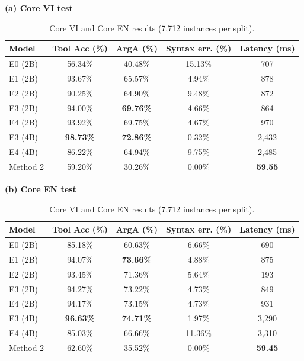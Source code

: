 \documentclass[10pt,twocolumn,a4paper]{article}
\newcommand{\tabletext}{\small}
\begin{document}
\begin{table}[htbp]
    \centering
    \caption{Core VI and Core EN results (7,712 instances per split).}
    \label{tab:core-results}
    \tabletext
    \textbf{(a) Core VI test}\\[2pt]
    \begin{tabular*}{\textwidth}{@{\extracolsep{\fill}}lcccc@{}}
        \toprule
        \textbf{Model} & \textbf{Tool Acc (\%)} & \textbf{ArgA (\%)} & \textbf{Syntax err. (\%)} & \textbf{Latency (ms)} \\
        \midrule
        E0 (2B) & 56.34\% & 40.48\% & 15.13\% & 707 \\
        E1 (2B) & 93.67\% & 65.57\% & 4.94\% & 878 \\
        E2 (2B) & 90.25\% & 64.90\% & 9.48\% & 872 \\
        E3 (2B) & 94.00\% & \textbf{69.76\%} & 4.66\% & 864 \\
        E4 (2B) & 93.92\% & 69.75\% & 4.67\% & 970 \\
        E3 (4B) & \textbf{98.73\%} & \textbf{72.86\%} & 0.32\% & 2,432 \\
        E4 (4B) & 86.22\% & 64.94\% & 9.75\% & 2,485 \\
        Method 2 & 59.20\% & 30.26\% & 0.00\% & \textbf{59.55} \\
        \bottomrule
    \end{tabular*}
    \par\medskip
    \textbf{(b) Core EN test}\\[2pt]
    \begin{tabular*}{\textwidth}{@{\extracolsep{\fill}}lcccc@{}}
        \toprule
        \textbf{Model} & \textbf{Tool Acc (\%)} & \textbf{ArgA (\%)} & \textbf{Syntax err. (\%)} & \textbf{Latency (ms)} \\
        \midrule
        E0 (2B) & 85.18\% & 60.63\% & 6.66\% & 690 \\
        E1 (2B) & 94.07\% & \textbf{73.66\%} & 4.88\% & 875 \\
        E2 (2B) & 93.45\% & 71.36\% & 5.64\% & 193 \\
        E3 (2B) & 94.27\% & 73.22\% & 4.73\% & 849 \\
        E4 (2B) & 94.17\% & 73.15\% & 4.73\% & 931 \\
        E3 (4B) & \textbf{96.63\%} & \textbf{74.71\%} & 1.97\% & 3,290 \\
        E4 (4B) & 85.03\% & 66.66\% & 11.36\% & 3,310 \\
        Method 2 & 62.60\% & 35.52\% & 0.00\% & \textbf{59.45} \\

\end{tabular*}
\end{table}
\end{document}
